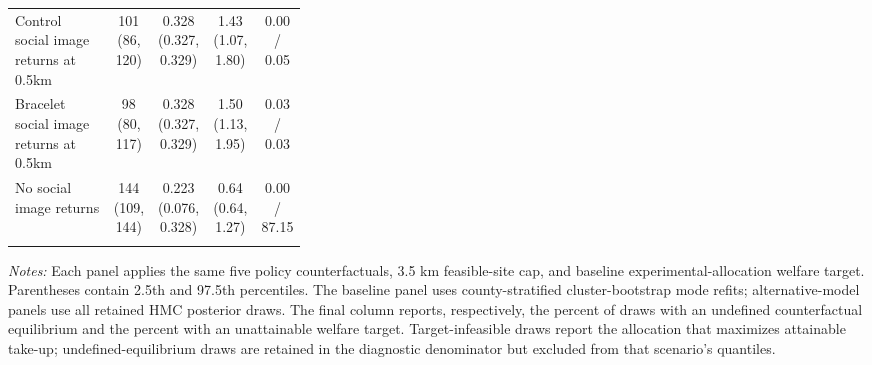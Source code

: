 \begin{longtable}{p{0.34\linewidth}cccc}
Control social image returns at 0.5km & \makecell[c]{101\\(86, 120)} & \makecell[c]{0.328\\(0.327, 0.329)} & \makecell[c]{1.43\\(1.07, 1.80)} & 0.00 / 0.05 \\
Bracelet social image returns at 0.5km & \makecell[c]{98\\(80, 117)} & \makecell[c]{0.328\\(0.327, 0.329)} & \makecell[c]{1.50\\(1.13, 1.95)} & 0.03 / 0.03 \\
No social image returns & \makecell[c]{144\\(109, 144)} & \makecell[c]{0.223\\(0.076, 0.328)} & \makecell[c]{0.64\\(0.64, 1.27)} & 0.00 / 87.15 \\
\addlinespace
\bottomrule
\end{longtable}
\begin{minipage}{\linewidth}
\footnotesize \textit{Notes:} Each panel applies the same five policy counterfactuals, 3.5 km feasible-site cap, and baseline experimental-allocation welfare target. Parentheses contain 2.5th and 97.5th percentiles. The baseline panel uses county-stratified cluster-bootstrap mode refits; alternative-model panels use all retained HMC posterior draws. The final column reports, respectively, the percent of draws with an undefined counterfactual equilibrium and the percent with an unattainable welfare target. Target-infeasible draws report the allocation that maximizes attainable take-up; undefined-equilibrium draws are retained in the diagnostic denominator but excluded from that scenario's quantiles.
\end{minipage}

